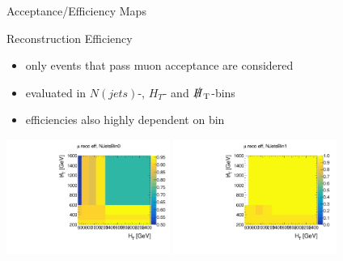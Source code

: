 \begin{frame}{Acceptance/Efficiency Maps}

\begin{block}{Reconstruction Efficiency}
\begin{itemize}
\item only events that pass muon acceptance are considered
\item evaluated in $N(\si{jets})$-, $H_{\si{T}}$- and $\slashed H_{\si{T}}$-bins
\item efficiencies also highly dependent on bin
\end{itemize}
\end{block}

\begin{center}
\includegraphics[width = 0.4\textwidth]{plots11/MuonRecoEff_NJetsBin0.pdf}
\includegraphics[width = 0.4\textwidth]{plots11/MuonRecoEff_NJetsBin1.pdf}
\end{center}

\end{frame}


